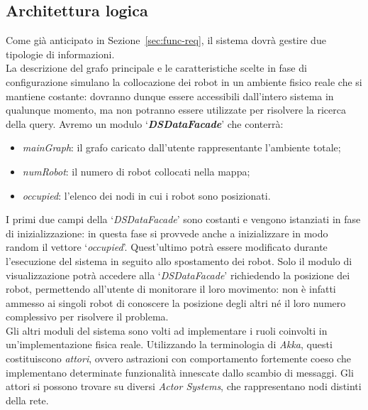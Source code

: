 
\subsection{Architettura logica}
\label{sec:logical-arch}
Come già anticipato in Sezione~\ref{sec:func-req},
il sistema dovrà gestire due tipologie di informazioni.\\

La descrizione del grafo principale e le caratteristiche scelte
in fase di configurazione simulano la collocazione dei robot in
un ambiente fisico reale che si mantiene costante: dovranno dunque
essere accessibili dall'intero sistema in qualunque momento,
ma non potranno essere utilizzate per risolvere la ricerca della query.
Avremo un modulo `\textbf{\emph{DSDataFacade}}' che conterrà:
\begin{itemize}
\item \emph{mainGraph}: il grafo caricato dall'utente rappresentante
  l'ambiente totale;
\item \emph{numRobot}: il numero di robot collocati nella mappa;
\item \emph{occupied}: l'elenco dei nodi in cui i robot sono posizionati.
\end{itemize}
I primi due campi della `\emph{DSDataFacade}' sono costanti e vengono
istanziati in fase di inizializzazione: in questa fase si provvede anche
a inizializzare in modo random il vettore `\emph{occupied}'. Quest'ultimo
potrà essere modificato durante l'esecuzione del sistema in seguito allo
spostamento dei robot.
Solo il modulo di visualizzazione potrà accedere alla `\emph{DSDataFacade}'
richiedendo la posizione dei robot, permettendo all'utente di monitorare
il loro movimento: non è infatti ammesso ai singoli robot di conoscere
la posizione degli altri né il loro numero complessivo per risolvere
il problema.\\

Gli altri moduli del sistema sono volti ad implementare i
ruoli coinvolti in un'implementazione fisica reale.
Utilizzando la terminologia di \emph{Akka}, questi costituiscono
\emph{attori}, ovvero astrazioni con comportamento fortemente coeso
che implementano determinate funzionalità innescate dallo scambio di
messaggi. Gli attori si possono trovare su diversi \emph{Actor Systems},
che rappresentano nodi distinti della rete.

